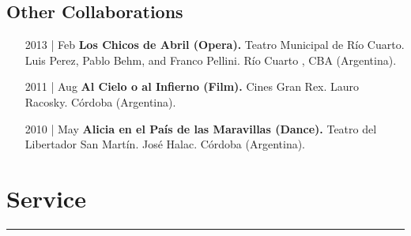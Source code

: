 \documentclass[12pt]{article}%
\begin{document}
\subsection{Other Collaborations}%
\begin{itemize}[align=parleft,leftmargin=2.25cm,labelwidth=2cm]
\item[2013 | Feb]
\textbf{Los Chicos de Abril (Opera).}
Teatro Municipal de Río Cuarto. 
Luis Perez, Pablo Behm, and Franco Pellini. 
Río Cuarto , CBA (Argentina). 
\end{itemize}%
\begin{itemize}[align=parleft,leftmargin=2.25cm,labelwidth=2cm]
\item[2011 | Aug]
\textbf{Al Cielo o al Infierno (Film).}
Cines Gran Rex. 
Lauro Racosky. 
Córdoba (Argentina). 
\end{itemize}%
\begin{itemize}[align=parleft,leftmargin=2.25cm,labelwidth=2cm]
\item[2010 | May]
\textbf{Alicia en el País de las Maravillas (Dance).}
Teatro del Libertador San Martín. 
José Halac. 
Córdoba (Argentina). 
\end{itemize}

%
\section{Service}%
\label{sec:Service}%
\hrule%
\end{document}
